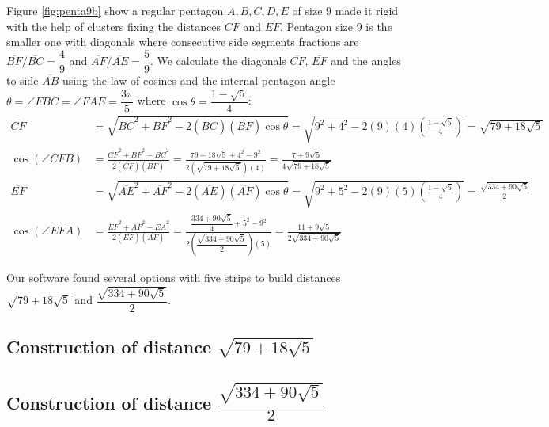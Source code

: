 \documentclass[11pt]{article}
\begin{document}
Figure \ref{fig:penta9b} show a regular pentagon $A,B,C,D,E$ of size $9$ made it rigid with the help of clusters fixing the distances $\overline{CF}$ and $\overline{EF}$. Pentagon size $9$ is the smaller one with diagonals where consecutive side segments fractions are $\overline{BF} / \overline{BC} =\dfrac{4}9$ and $\overline{AF} / \overline{AE} = \dfrac{5}9$. We calculate the diagonals $\overline{CF}$, $\overline{EF}$ and the angles to side $\overline{AB}$ using the law of cosines and the internal pentagon angle $\theta=\angle{FBC}=\angle{FAE}=\dfrac{3\pi}5$ where $\cos\theta = \dfrac{1-\sqrt5}4$:
\begin{align}
\overline{CF} &= \sqrt{
 \overline{BC}^2 + \overline{BF}^2 - 2(\overline{BC})(\overline{BF})\cos\theta } 
 = \sqrt{9^2 + 4^2 - 2(9)(4)\left(\frac{1-\sqrt5}4\right)} = \sqrt{79 + 18\sqrt5}\\
%
\cos(\angle{CFB}) &= 
 \frac{\overline{CF}^2 + \overline{BF}^2 - \overline{BC}^2}{2(\overline{CF})(\overline{BF})}
 = \frac{79 + 18\sqrt5 + 4^2 - 9^2}{2(\sqrt{79 + 18\sqrt5})(4)}
 = \frac{7 + 9\sqrt5}{4\sqrt{79 + 18\sqrt5}} \\
%
\overline{EF} &= \sqrt{
 \overline{AE}^2 + \overline{AF}^2 - 2(\overline{AE})(\overline{AF})\cos\theta} 
 = \sqrt{9^2 + 5^2 - 2(9)(5)\left(\frac{1-\sqrt5}4\right)} = \frac{\sqrt{334 + 90\sqrt5}}2\\
%
\cos(\angle{EFA}) &=
 \frac{\overline{EF}^2 + \overline{AF}^2 - \overline{EA}^2}{2(\overline{EF})(\overline{AF})}
 = \frac{\dfrac{334 + 90\sqrt5}4 + 5^2 - 9^2 }{2\left(\dfrac{\sqrt{334 + 90\sqrt5}}2\right)(5)}
 = \frac{11 + 9\sqrt5}{2\sqrt{334 + 90\sqrt5}}
\end{align}

Our software found several options with five strips to build distances $\sqrt{79 + 18\sqrt5}$
and $\dfrac{\sqrt{334 + 90\sqrt5}}2$.

\subsection{Construction of distance $\sqrt{79 + 18\sqrt5}$}

\subsection{Construction of distance $\dfrac{\sqrt{334 + 90\sqrt5}}2$}
\end{document}
